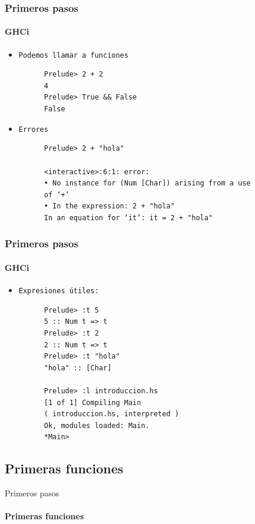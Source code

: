 \documentclass{beamer}
\begin{document}
\begin{frame}[fragile]
  \frametitle{Primeros pasos}
  \framesubtitle{GHCi}
  \begin{itemize}
  \item\texttt{Podemos llamar a funciones}
    \begin{verbatim}
      Prelude> 2 + 2
      4
      Prelude> True && False
      False
    \end{verbatim}


  \item\texttt{Errores}
    \begin{verbatim}
      Prelude> 2 + "hola"

      <interactive>:6:1: error:
      • No instance for (Num [Char]) arising from a use
      of ‘+’
      • In the expression: 2 + "hola"
      In an equation for ‘it’: it = 2 + "hola"
    \end{verbatim}
  \end{itemize}
\end{frame}

\begin{frame}[fragile]
  \frametitle{Primeros pasos}
  \framesubtitle{GHCi}
  \begin{itemize}
  \item\texttt{Expresiones útiles:}
    \begin{verbatim}
      Prelude> :t 5
      5 :: Num t => t
      Prelude> :t 2
      2 :: Num t => t
      Prelude> :t "hola"
      "hola" :: [Char]

      Prelude> :l introduccion.hs
      [1 of 1] Compiling Main
      ( introduccion.hs, interpreted )
      Ok, modules loaded: Main.
      *Main>
    \end{verbatim}
  \end{itemize}
\end{frame}

\subsection{Primeras funciones}
\begin{frame}{Primeros pasos}      %
  \framesubtitle{Primeras funciones}

\end{frame}
\end{document}
